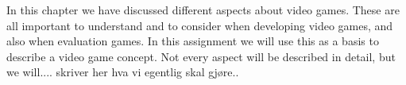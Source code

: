 In this chapter we have discussed different aspects about video games. These are all important to understand and to consider when developing video games, and also when evaluation games. In this assignment we will use this as a basis to describe a video game concept. Not every aspect will be described in detail, but we will.... skriver her hva vi egentlig skal gjøre.. 

